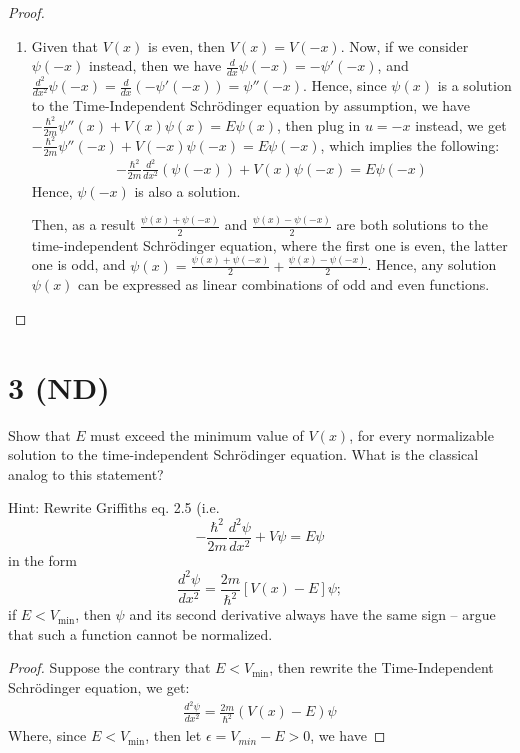 \documentclass{article}
\begin{document}
\begin{proof}
\begin{enumerate}
        \hfil

        \item Given that $V(x)$ is even, then $V(x)=V(-x)$. Now, if we consider $\psi(-x)$ instead, then we have $\frac{d}{dx}\psi(-x)=-\psi'(-x)$, and $\frac{d^2}{dx^2}\psi(-x)=\frac{d}{dx}\left(-\psi'(-x)\right) = \psi''(-x)$. Hence, since $\psi(x)$ is a solution to the Time-Independent Schrödinger equation by assumption, we have $-\frac{\hbar^2}{2m}\psi''(x)+V(x)\psi(x)=E\psi(x)$, then plug in $u=-x$ instead, we get $-\frac{\hbar^2}{2m}\psi''(-x)+V(-x)\psi(-x)=E\psi(-x)$, which implies the following:
        \begin{align}
            -\frac{\hbar^2}{2m}\frac{d^2}{dx^2}(\psi(-x))+V(x)\psi(-x)=E\psi(-x)
        \end{align}
        Hence, $\psi(-x)$ is also a solution. 

        Then, as a result $\frac{\psi(x)+\psi(-x)}{2}$ and $\frac{\psi(x)-\psi(-x)}{2}$ are both solutions to the time-independent Schrödinger equation, where the first one is even, the latter one is odd, and $\psi(x)=\frac{\psi(x)+\psi(-x)}{2}+\frac{\psi(x)-\psi(-x)}{2}$. Hence, any solution $\psi(x)$ can be expressed as linear combinations of odd and even functions.
    \end{enumerate}
\end{proof}

\newpage

\section*{3  (ND)}
\begin{ques}\label{q3}
Show that $E$ must exceed the minimum value of $V(x)$, for every normalizable solution to
the time-independent Schrödinger equation. What is the classical analog to this statement?

Hint: Rewrite Griffiths eq. 2.5 (i.e.
\[
-\frac{\hbar^2}{2m}\frac{d^2\psi}{dx^2} + V\psi = E\psi
\]
in the form
\[
\frac{d^2\psi}{dx^2} = \frac{2m}{\hbar^2}[V(x) - E]\psi;
\]
if $E < V_{\min}$, then $\psi$ and its second derivative always have the same sign – argue that such
a function cannot be normalized.
\end{ques}

\begin{proof}
    Suppose the contrary that $E< V_{\min}$, then rewrite the Time-Independent Schrödinger equation, we get:
    \begin{align}
        \frac{d^2\psi}{dx^2} = \frac{2m}{\hbar^2}(V(x) - E)\psi
    \end{align}
    Where, since $E<V_{\min}$, then let $\epsilon=V_{min}-E>0$, we have 
\end{proof}
\end{document}

